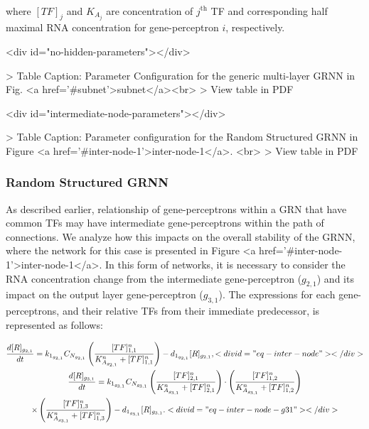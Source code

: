 \documentclass[twocolumn]{biophys-new}
\begin{document}
{{\begin{multline}
\end{multline}
where $[TF]_j$ and $K_{A_j}$ are concentration of $j^{\text{th}}$ TF and corresponding half maximal RNA concentration for gene-perceptron $i$, respectively. 
\begin{table}<div id="no-hidden-parameters"></div>

> Table Caption: Parameter Configuration for the generic multi-layer GRNN in Fig. <a href='#subnet'>subnet</a><br>
> View table in PDF
\end{table}

\begin{table}<div id="intermediate-node-parameters"></div>

> Table Caption: Parameter configuration for the Random Structured GRNN in Figure <a href='#inter-node-1'>inter-node-1</a>. \vspace{-0.5em}<br>
> View table in PDF
\end{table}


\subsubsection*{Random Structured GRNN}
As described earlier, relationship of gene-perceptrons within a GRN that have common TFs may have intermediate gene-perceptrons within the path of connections. We analyze how this impacts on the overall stability of the GRNN, where the network for this case is presented in Figure <a href='#inter-node-1'>inter-node-1</a>. In this form of networks, it is necessary to consider the RNA concentration change from the intermediate gene-perceptron ($g_{2,1}$) and its impact on the output layer gene-perceptron ($g_{3,1}$). The expressions for each gene-perceptrons, and their relative TFs from their immediate predecessor, is represented as follows: 


\vspace{-1em}
\begin{gather}
\dfrac{d[R]_{g_{2,1}}}{dt} = k_{1_{g_{2,1}}} C_{N_{g_{2,1}}}\left( \dfrac{[TF]_{1,1}^n}{K_{A_{g_{2,1}}}^n+ [TF]_{1,1}^n} \right) 
- d_{ 1_{g_{2,1}}} [R]_{g_{2,1}}, <div id="eq-inter-node"></div>
 \\
\dfrac{d[R]_{g_{3,1}}}{dt} = k_{1_{g_{3,1}}} C_{N_{g_{3,1}}}\left( \dfrac{[TF]_{2,1}^n}{K_{A_{g_{3,1}}}^n+ [TF]_{2,1}^n} \right) 
\cdot\left( \dfrac{[TF]_{1,2}^n}{K_{A_{g_{3,1}}}^n+ [TF]_{1,2}^n} \right) \nonumber \\ \times \left( \dfrac{[TF]_{1,3}^n}{K_{A_{g_{3,1}}}^n+ [TF]_{1,3}^n} \right) - d_{ 1_{g_{3,1}} } [R]_{g_{3,1}}. <div id="eq-inter-node-g31"></div>


\end{gather}}}
\end{document}
